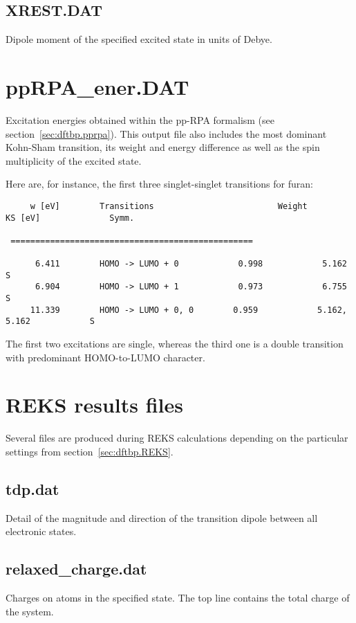 \subsection{XREST.DAT}

Dipole moment of the specified excited state in units of Debye.

\section{ppRPA\_ener.DAT}
\label{sec:ppRPAout}

Excitation energies obtained within the pp-RPA formalism (see
section~\ref{sec:dftbp.pprpa}). This output file also includes the most dominant
Kohn-Sham transition, its weight and energy difference as well as the spin
multiplicity of the excited state.

Here are, for instance, the first three singlet-singlet transitions for furan:

\begin{verbatim}
     w [eV]        Transitions                         Weight            KS [eV]              Symm.

 =================================================  

      6.411        HOMO -> LUMO + 0            0.998            5.162                     S
      6.904        HOMO -> LUMO + 1            0.973            6.755                     S
     11.339        HOMO -> LUMO + 0, 0        0.959            5.162,  5.162            S
\end{verbatim}  

The first two excitations are single, whereas the third one is a double
transition with predominant HOMO-to-LUMO character.

\section{REKS results files}
\label{sec:reks_files}
Several files are produced during REKS calculations depending on the
particular settings from section~\ref{sec:dftbp.REKS}.


\subsection{tdp.dat}

Detail of the magnitude and direction of the transition dipole between all electronic states.

\subsection{relaxed\_charge.dat}

Charges on atoms in the specified state. The top line contains the total charge of the system.


